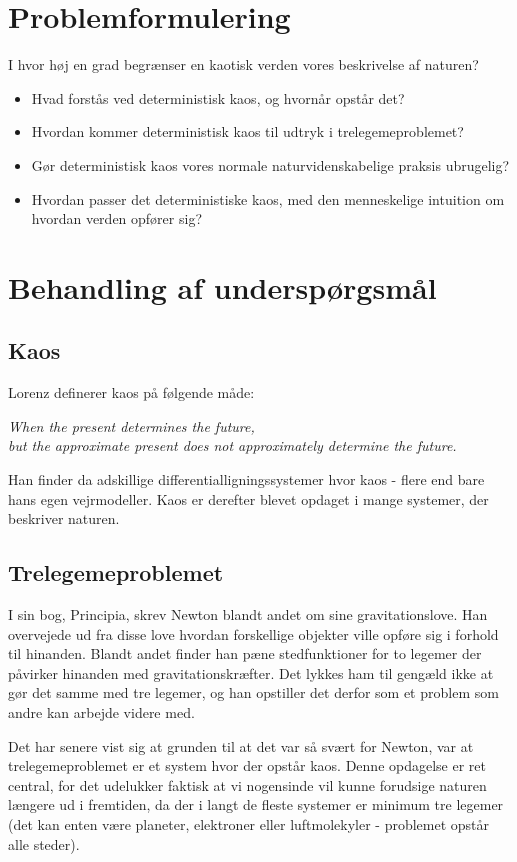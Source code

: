 \documentclass[12pt,a4paper]{article}
\theoremstyle{break}
\theoremstyle{nonumberplain}
\begin{document}
\section{Problemformulering}
I hvor høj en grad begrænser en kaotisk verden vores beskrivelse af naturen?

\begin{itemize}
\item Hvad forstås ved deterministisk kaos, og hvornår opstår det?
\item Hvordan kommer deterministisk kaos til udtryk i trelegemeproblemet?
\item Gør deterministisk kaos vores normale naturvidenskabelige praksis ubrugelig?
\item Hvordan passer det deterministiske kaos, med den menneskelige intuition om hvordan verden opfører sig?
\end{itemize}

\section{Behandling af underspørgsmål}

\subsection{Kaos}
Lorenz definerer kaos på følgende måde:
\begin{center}
		\textit{When the present determines the future, \\
		but the approximate present does not approximately determine the future.}
\end{center}
Han finder da adskillige differentialligningssystemer hvor kaos - flere end bare hans egen vejrmodeller.
Kaos er derefter blevet opdaget i mange systemer, der beskriver naturen. 

\subsection{Trelegemeproblemet}
I sin bog, Principia, skrev Newton blandt andet om sine gravitationslove. 
Han overvejede ud fra disse love hvordan forskellige objekter ville opføre sig i forhold til hinanden. 
Blandt andet finder han pæne stedfunktioner for to legemer der påvirker hinanden med gravitationskræfter. 
Det lykkes ham til gengæld ikke at gør det samme med tre legemer, og han opstiller det derfor som et problem som andre kan arbejde videre med. 

Det har senere vist sig at grunden til at det var så svært for Newton, var at trelegemeproblemet er et system hvor der opstår kaos. 
Denne opdagelse er ret central, for det udelukker faktisk at vi nogensinde vil kunne forudsige naturen længere ud i fremtiden, da der i langt de fleste systemer er minimum tre legemer (det kan enten være planeter, elektroner eller luftmolekyler - problemet opstår alle steder).
\end{document}
